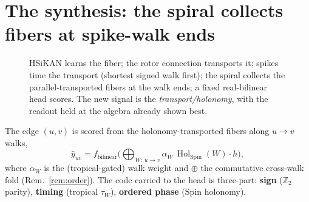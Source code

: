 \documentclass[11pt]{article}
\theoremstyle{definition}
\theoremstyle{plain}
\theoremstyle{remark}
\newcommand{\Hol}{\operatorname{Hol}}
\newcommand{\Spin}{\mathrm{Spin}}
\newcommand{\Z}{\mathbb{Z}}
\begin{document}
\section{The synthesis: the spiral collects fibers at spike-walk ends}
\begin{figure}[h]\centering
{}
\caption{HSiKAN learns the fiber; the rotor connection transports it; spikes time the transport (shortest signed
walk first); the spiral collects the parallel-transported fibers at the walk ends; a fixed real-bilinear head
scores. The new signal is the \emph{transport/holonomy}, with the readout held at the algebra already shown best.}
\end{figure}
The edge $(u,v)$ is scored from the holonomy-transported fibers along $u\!\to\!v$ walks,
\[
\hat y_{uv}=f_{\text{bilinear}}\!\Big(\bigoplus_{W:\,u\to v}\alpha_W\,\Hol_{\Spin}(W)\!\cdot\!h\Big),
\]
where $\alpha_W$ is the (tropical-gated) walk weight and $\oplus$ the commutative cross-walk fold
(Rem.~\ref{rem:order}). The code carried to the head is three-part: \textbf{sign} ($\Z_2$ parity), \textbf{timing}
(tropical $\tau_W$), \textbf{ordered phase} ($\Spin$ holonomy).
\end{document}
